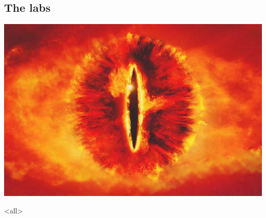 \subsection{The labs}

\begin{frame}
  \includegraphics[width=\columnwidth]{figs/sauron.jpg}
\end{frame}


\mode<all>{}


